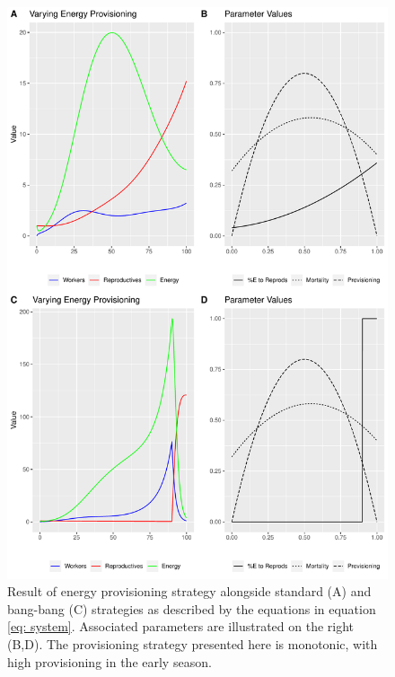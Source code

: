 \documentclass[12pt]{report}
\begin{document}
\begin{figure}[t]
\centering
\includegraphics{FinalProject-VarEPlot}
\caption{Result of energy provisioning strategy alongside standard (A) and bang-bang (C) strategies as described by the equations in equation \ref{eq: system}. Associated parameters are illustrated on the right (B,D). The provisioning strategy presented here is monotonic, with high provisioning in the early season. }
\end{figure}
\end{document}
